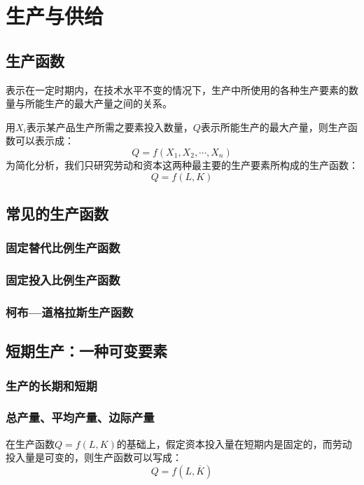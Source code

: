 \chapter{生产与供给}
\label{sec:production-and-supply}

\section{生产函数}

\begin{Definition}[生产函数]
表示在一定时期内，在技术水平不变的情况下，生产中所使用的各种生产要素的数量与所能生产的最大产量之间的关系。
\end{Definition}

用$X_i$表示某产品生产所需之要素投入数量，$Q$表示所能生产的最大产量，则生产函数可以表示成：
\[
Q=f(X_1, X_2, \cdots , X_n)
\]
为简化分析，我们只研究劳动和资本这两种最主要的生产要素所构成的生产函数：
\[
Q=f(L,K)
\]

\section{常见的生产函数}
\subsection{固定替代比例生产函数}
\subsection{固定投入比例生产函数}
\subsection{柯布—道格拉斯生产函数}

\section{短期生产：一种可变要素}
\subsection{生产的长期和短期}
\subsection{总产量、平均产量、边际产量}
在生产函数$Q=f(L,K)$的基础上，假定资本投入量在短期内是固定的，而劳动投入量是可变的，则生产函数可以写成：
\begin{equation}
Q = f(L,\overline K )
\end{equation}

